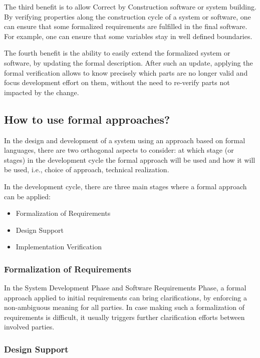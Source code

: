 The third benefit is to allow Correct by Construction software or
system building. By verifying properties along the construction
cycle of a system or software, one can ensure that some formalized
requirements are fulfilled in the final software. For example, one can
ensure that some variables stay in well defined boundaries.

The fourth benefit is the ability to easily extend the formalized
system or software, by updating the formal description. After such an
update, applying the formal verification allows to know precisely
which parts are no longer valid and focus development effort on them,
without the need to re-verify parts not impacted by the change.

\subsection{How to use formal approaches?}

In the design and development of a system using an approach based on
formal languages, there are two orthogonal aspects to consider: at which
stage (or stages) in the development cycle the formal approach will be
used and how it will be used, i.e., choice of approach, technical
realization.

In the development cycle, there are three main stages where a formal
approach can be applied:

\begin{itemize}
\item Formalization of Requirements
\item Design Support
\item Implementation Verification
\end{itemize}

\subsubsection{Formalization of Requirements}
\label{sec:formalization-of-req}

In the System Development Phase and Software Requirements Phase, a
formal approach applied to initial requirements can bring
clarifications, by enforcing a non-ambiguous meaning for all
parties. In case making such a formalization of requirements is
difficult, it usually triggers further clarification efforts between
involved parties.

\subsubsection{Design Support}
\label{sec:design-support}

